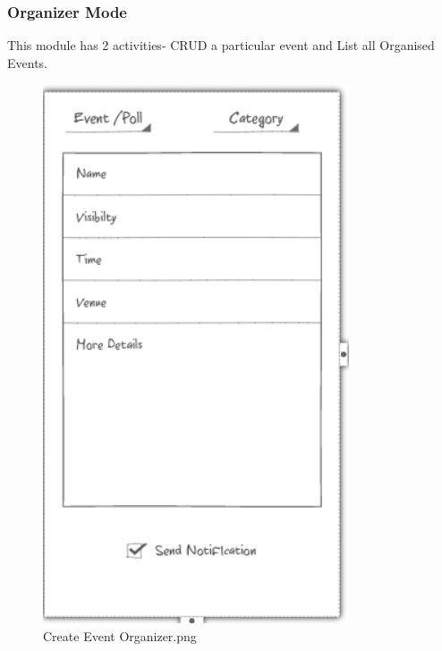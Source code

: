 \documentclass{article}
\begin{document}
\subsubsection{Organizer Mode}
This module has 2 activities- CRUD a particular event and List all Organised Events.
\begin{figure}[h]
    \centering
    \includegraphics[scale=0.3]{OCRUD.png}
    \caption{Create Event Organizer.png}
\end{figure}
\end{document}
